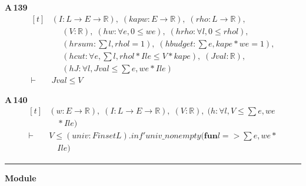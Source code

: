 \noindent\textbf{A\,139}\quad{}
{\footnotesize\[ \begin{aligned}[t]
&(\mathit{I} : \mathit{L} \to \mathit{E} \to \mathbb{R} ),\; (\mathit{kap} \mathit{w} : \mathit{E} \to \mathbb{R} ),\; (\mathit{rho} : \mathit{L} \to \mathbb{R} ),\\
&\quad \; (\mathit{V} : \mathbb{R} ),\; (\mathit{hw} : \forall \mathit{e}, 0 \leq \mathit{w} \mathit{e}),\; (\mathit{hrho} : \forall \mathit{l}, 0 \leq \mathit{rho} \mathit{l}),\\
&\quad \; (\mathit{hrsum} : \textstyle\sum \mathit{l}, \mathit{rho} \mathit{l} = 1),\; (\mathit{hbudget} : \textstyle\sum \mathit{e}, \mathit{kap} \mathit{e} * \mathit{w} \mathit{e} = 1),\\
&\quad \; (\mathit{hcut} : \forall \mathit{e}, \textstyle\sum \mathit{l}, \mathit{rho} \mathit{l} * \mathit{I} \mathit{l} \mathit{e} \leq \mathit{V} * \mathit{kap} \mathit{e}),\; (\mathit{Jval} : \mathbb{R} ),\\
&\quad \; (\mathit{hJ} : \forall \mathit{l}, \mathit{Jval} \leq \textstyle\sum \mathit{e}, \mathit{w} \mathit{e} * \mathit{I} \mathit{l} \mathit{e})\\
\vdash\;&\mathit{Jval} \leq \mathit{V}
\end{aligned} \]}

\noindent\textbf{A\,140}\quad{}
{\footnotesize\[ \begin{aligned}[t]
&(\mathit{w} : \mathit{E} \to \mathbb{R} ),\; (\mathit{I} : \mathit{L} \to \mathit{E} \to \mathbb{R} ),\; (\mathit{V} : \mathbb{R} ),\; (\mathit{h} : \forall \mathit{l}, \mathit{V} \leq \textstyle\sum \mathit{e}, \mathit{w} \mathit{e}\\
&\quad * \mathit{I} \mathit{l} \mathit{e})\\
\vdash\;&\mathit{V} \leq (\mathit{univ} : \mathit{Finset} \mathit{L}).\mathit{inf'} \mathit{univ\_nonempty} (\mathbf{fun} \mathit{l} => \textstyle\sum \mathit{e}, \mathit{w} \mathit{e} *\\
&\quad \mathit{I} \mathit{l} \mathit{e})
\end{aligned} \]}

\vspace{4pt}\noindent\rule{\columnwidth}{0.4pt}\par\vspace{2pt}
\noindent\textbf{Module }\par\vspace{3pt}

